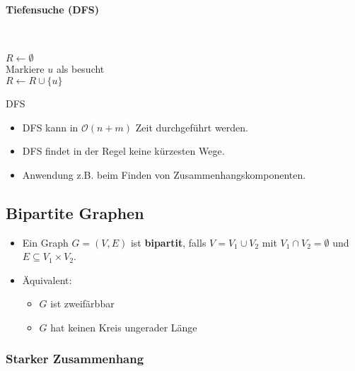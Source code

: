 \documentclass{scrartcl}
\begin{document}
\paragraph{Tiefensuche (DFS)}\mbox{} \\
\begin{algorithm}[H]
	$ R \leftarrow \emptyset $ \\
	Markiere $ u $ als besucht \\
	$ R \leftarrow R \cup \{ u \} $ \\
	\caption{DFS}
\end{algorithm}



\begin{itemize}
	\item DFS kann in $ \mathcal{O}(n+m) $ Zeit durchgeführt werden.
	\item DFS findet in der Regel keine kürzesten Wege.
	\item Anwendung z.B. beim Finden von Zusammenhangskomponenten.
\end{itemize}

\subsection{Bipartite Graphen}



\begin{itemize}
	\item Ein Graph $ G = (V,E) $ ist \textbf{bipartit}, falls $ V = V_1 \cup V_2 $ mit $ V_1 \cap V_2 = \emptyset $ und $ E \subseteq V_1 \times V_2 $.
	\item Äquivalent:
	\begin{itemize}
		\item $ G $ ist zweifärbbar \\
		
		\item $ G $ hat keinen Kreis ungerader Länge \\
		
	\end{itemize}
\end{itemize}

\subsubsection{Starker Zusammenhang}
\end{document}
